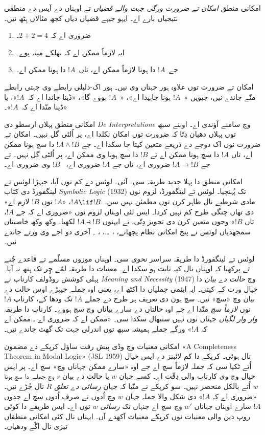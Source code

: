 \documentclass[../../../include/open-logic-section]{subfiles}
\begin{document}


امکانی منطق \emph{امکان تے ضرورت ورگی جہت والے قضیاں} تے
اوہناں دے آپس دے منطقی نتیجیاں بارے اے۔ ایہو جیہے قضیاں دیاں
کجھ مثالاں ہِٹھ نیں۔
\begin{enumerate}
\item ضروری اے کہ $2+2=4$۔
\item ایہ لازماً ممکن اے کہ بھلکے مینہ پوے۔
\item جے~$!A$ دا ہونا لازماً ممکن اے، تاں~$!A$ دا ہونا ممکن اے۔
\end{enumerate}
امکان تے ضرورت توں علاوہ ہور جہتاں وی نیں۔ ہور اک-دلیلی
رابطے وی جہتی رابطے منّے جاندے نیں، جیویں «~$!A$ ہونا چاہیدا
اے»، «~$!A$ ہووے گا»، «ڈینا جاندا اے کہ~$!A$»، یا
«ڈینا منّدا اے کہ~$!A$»۔

امکانی منطق پہلاں ارسطو دی \emph{De
  Interpretatione} وچ سامنے آؤندی اے۔ اوہنے سبھ توں پہلاں
دھیان دِتّا کہ ضرورت توں امکان نکلدا اے، پر اُلٹی گل نہیں۔
امکان تے ضرورت نوں اک دوجے دے ذریعے متعین کیتا جا سکدا اے۔
جے $!A \land !B$ دا سچ ہونا ممکن اے، تاں $!A$ دا سچ ہونا
ممکن اے تے $!B$ دا سچ ہونا وی ممکن اے، پر اُلٹی گل نہیں۔
تے جے $!A \to !B$ ضروری اے، تاں جے $!A$ ضروری اے،
~$!B$ وی ضروری اے۔

امکانی منطق دا پہلا جدید طریقہ سی۔ آئی۔ لوئس دے کم توں
آیا، جیہڑا لوئس تے لینگفورڈ دی کتاب \emph{Symbolic Logic}
(1932) تک پُہنچیا۔ لوئس تے لینگفورڈ، لزوم نوں مادی شرطیے
نال ظاہر کرن توں مطمئن نہیں سن۔ $!A \lif !B$، «$!A$ توں
$!B$ لازم اے» دی تھاں چنگی طرح کم نہیں کردا۔ ایس لئی اوہناں
لزوم نوں «ضروری اے کہ جے $!A$، تاں $!B$» وجوں متعین
کرن دی تجویز دِتّی، تے ایہنوں $!A \strictif !B$ لکھیا۔
وکھ وکھ خاصیتاں سمجھدیاں لوئس نے پنج امکانی نظام پچھانے،
، \ldots، ، ۔ آخری دو اجے وی
ورتے جاندے نیں۔

لوئس تے لینگفورڈ دا طریقہ سراسر \emph{نحوی} سی۔ اوہناں
موزوں مسلّمے تے قاعدے چُنے تے پرکھیا کہ اوہناں نال کیہ
ثابت ہو سکدا اے۔ معنیات دا طریقہ لمّے چِر تک ہتھ نہ آیا۔ پہلی
کوشش روڈولف کارناپ نے \emph{Meaning and Necessity} (1947)
وچ \emph{حالت دے بیان} دا خیال ورت کے کیتی۔ ایہ ایٹمی
جملیاں دا اکٹھ اے، یعنی اوہ جملے جیہڑے اوس حالت دے بیان
وچ «سچ» نیں۔ سچ ہون دی تعریف ہر طرح دے جملے $!A$ تک
ودھا کے، کارناپ $!A$ نوں \emph{لازماً سچ} منّدا اے جے اوہ
حالتاں دے سارے بیاناں وچ سچ ہووے۔ کارناپ دا طریقہ \emph{وار
وار لگیاں} جہتاں نوں نہیں سنبھال سکدا سی۔ «ممکن اے کہ
ضروری اے \ldots ممکن اے کہ $!A$» ورگے جملے ہمیشہ
سبھ توں اندرلی جہت تک گھٹ جاندے نیں۔

امکانی معنیات وچ وڈی پیش رفت ساؤل کرپکے دے مضمون
«A Completeness Theorem in Modal Logic» (JSL 1959) نال
ہوئی۔ کرپکے دا کم لائبنز دے ایس خیال اُتے ٹکیا سی کہ جملہ
لازماً سچ اے جے اوہ «سارے ممکن جہاناں وچ» سچ اے۔ پر ایس
خیال وچ وی کارناپ والی دِقّت اے۔ کسے جہان $w$ یا حالت دے
بیان $s$ وچ جملے دا سچ ہونا $w$ اُتے بالکل منحصر نہیں۔
سو کرپکے نے منّیا کہ جہان \emph{رسائی دے تعلق} $R$ نال
جُڑے نیں۔ «ضروری اے کہ $!A$» دی شکل والا جملہ جہان $w$
وچ اُدوں تے صرف اُدوں سچ اے جدوں $!A$ سارے اوہناں جہاناں
$w'$ وچ سچ اے جنہاں تک \emph{رسائی} $w$ توں اے۔
ایس طریقے دا کوئی روپ دین والی معنیات نوں کرپکے معنیات
آکھدے آں۔ ایہناں نال کئی امکانی منطقاں تیزی نال اگّے ودھیاں۔
\end{document}
